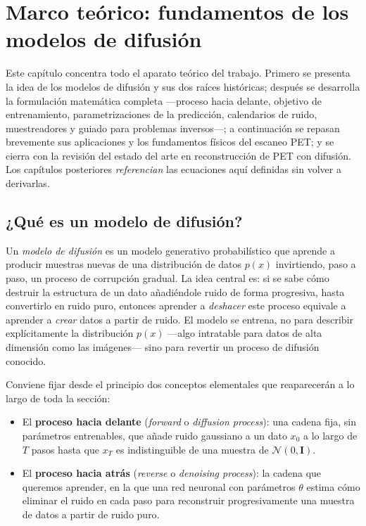 \chapter{Marco teórico: fundamentos de los modelos de difusión}
\label{cap:marco-teorico}

Este capítulo concentra todo el aparato teórico del trabajo. Primero
se presenta la idea de los modelos de difusión y sus dos raíces
históricas; después se desarrolla la formulación matemática completa
—proceso hacia delante, objetivo de entrenamiento, parametrizaciones
de la predicción, calendarios de ruido, muestreadores y guiado para
problemas inversos—; a continuación se repasan brevemente sus
aplicaciones y los fundamentos físicos del escaneo PET; y se cierra
con la revisión del estado del arte en reconstrucción de PET con
difusión. Los capítulos posteriores \emph{referencian} las ecuaciones
aquí definidas sin volver a derivarlas.

\section{¿Qué es un modelo de difusión?}
\label{sec:que-es-difusion}

Un \emph{modelo de difusión} es un modelo generativo probabilístico
que aprende a producir muestras nuevas de una distribución de datos
$p(x)$ invirtiendo, paso a paso, un proceso de corrupción gradual.
La idea central es: si se sabe cómo destruir la estructura de un dato 
añadiéndole ruido de forma progresiva, hasta
convertirlo en ruido puro, entonces aprender a \emph{deshacer} este proceso 
equivale a aprender a \emph{crear} datos a partir de
ruido. El modelo se entrena, no para describir
explícitamente la distribución $p(x)$ —algo intratable para datos de
alta dimensión como las imágenes— sino para revertir un proceso de
difusión conocido.

Conviene fijar desde el principio dos conceptos elementales que
reaparecerán a lo largo de toda la sección:

\begin{itemize}
    \item El \textbf{proceso hacia delante} (\textit{forward} o
    \textit{diffusion process}): una cadena fija, sin parámetros
    entrenables, que añade ruido gaussiano a un dato $x_0$ a lo largo
    de $T$ pasos hasta que $x_T$ es indistinguible de una muestra de
    $\mathcal{N}(0,\mathbf{I})$.
    \item El \textbf{proceso hacia atrás} (\textit{reverse} o
    \textit{denoising process}): la cadena que queremos aprender, en
    la que una red neuronal con parámetros $\theta$ estima cómo
    eliminar el ruido en cada paso para reconstruir progresivamente
    una muestra de datos a partir de ruido puro.
\end{itemize}

